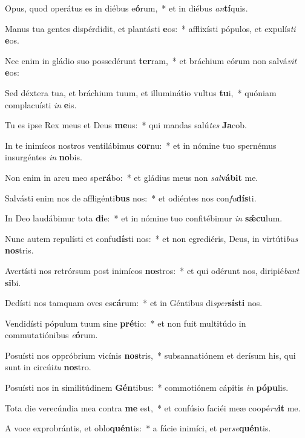 \item Opus, quod operátus es in diébus e\textbf{ó}rum,~* et in diébus \textit{an}\textbf{tí}quis.
\item Manus tua gentes dispérdidit, et plantásti \textbf{e}os:~* afflixísti pópulos, et expulís\textit{ti} \textbf{e}os.
\item Nec enim in gládio suo possedérunt \textbf{ter}ram,~* et bráchium eórum non salvá\textit{vit} \textbf{e}os:
\item Sed déxtera tua, et bráchium tuum, et illuminátio vultus \textbf{tu}i,~* quóniam complacuísti \textit{in} \textbf{e}is.
\item Tu es ipse Rex meus et Deus \textbf{me}us:~* qui mandas salú\textit{tes} \textbf{Ja}cob.
\item In te inimícos nostros ventilábimus \textbf{cor}nu:~* et in nómine tuo spernémus insurgéntes \textit{in} \textbf{no}bis.
\item Non enim in arcu meo spe\textbf{rá}bo:~* et gládius meus non \textit{sal}\textbf{vá}\textbf{bit} me.
\item Salvásti enim nos de affligénti\textbf{bus} nos:~* et odiéntes nos con\textit{fu}\textbf{dís}ti.
\item In Deo laudábimur tota \textbf{di}e:~* et in nómine tuo confitébimur \textit{in} \textbf{sǽ}\textbf{cu}lum.
\item Nunc autem repulísti et confu\textbf{dís}ti nos:~* et non egrediéris, Deus, in virtúti\textit{bus} \textbf{nos}tris.
\item Avertísti nos retrórsum post inimícos \textbf{nos}tros:~* et qui odérunt nos, diripié\textit{bant} \textbf{si}bi.
\item Dedísti nos tamquam oves es\textbf{cá}rum:~* et in Géntibus di\textit{sper}\textbf{sís}\textbf{ti} nos.
\item Vendidísti pópulum tuum sine \textbf{pré}tio:~* et non fuit multitúdo in commutatiónibus \textit{e}\textbf{ó}rum.
\item Posuísti nos oppróbrium vicínis \textbf{nos}tris,~* subsannatiónem et derísum his, qui sunt in circúi\textit{tu} \textbf{nos}tro.
\item Posuísti nos in similitúdinem \textbf{Gén}tibus:~* commotiónem cápitis \textit{in} \textbf{pó}\textbf{pu}lis.
\item Tota die verecúndia mea contra \textbf{me} est,~* et confúsio faciéi meæ coopé\textit{ru}\textbf{it} me.
\item A voce exprobrántis, et oblo\textbf{quén}tis:~* a fácie inimíci, et per\textit{se}\textbf{quén}tis.
